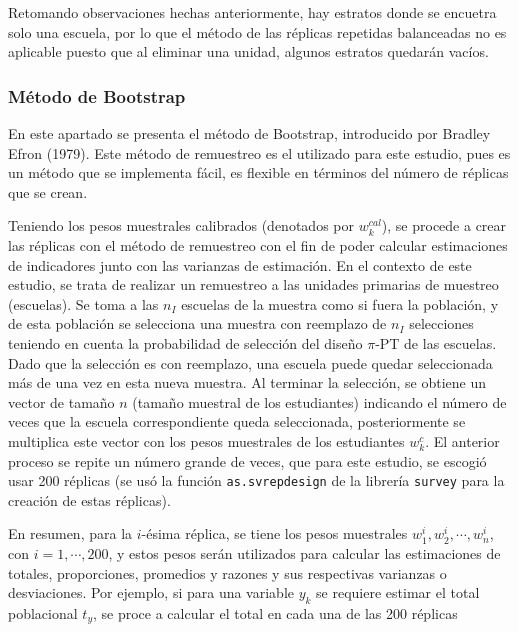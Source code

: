 \documentclass[12pt,spanish,]{book}
\begin{document}
Retomando observaciones hechas anteriormente, hay estratos donde se encuetra solo una escuela, por lo que el método de las réplicas repetidas balanceadas no es aplicable puesto que al eliminar una unidad, algunos estratos quedarán vacíos.

\hypertarget{metodo-de-bootstrap}{%
\subsubsection*{Método de Bootstrap}\label{metodo-de-bootstrap}}

En este apartado se presenta el método de Bootstrap, introducido por Bradley Efron (1979). Este método de remuestreo es el utilizado para este estudio, pues es un método que se implementa fácil, es flexible en términos del número de réplicas que se crean.

Teniendo los pesos muestrales calibrados (denotados por \(w_k^{cal}\)), se procede a crear las réplicas con el método de remuestreo con el fin de poder calcular estimaciones de indicadores junto con las varianzas de estimación. En el contexto de este estudio, se trata de realizar un remuestreo a las unidades primarias de muestreo (escuelas). Se toma a las \(n_I\) escuelas de la muestra como si fuera la población, y de esta población se selecciona una muestra con reemplazo de \(n_I\) selecciones teniendo en cuenta la probabilidad de selección del diseño \(\pi\)-PT de las escuelas. Dado que la selección es con reemplazo, una escuela puede quedar seleccionada más de una vez en esta nueva muestra. Al terminar la selección, se obtiene un vector de tamaño \(n\) (tamaño muestral de los estudiantes) indicando el número de veces que la escuela correspondiente queda seleccionada, posteriormente se multiplica este vector con los pesos muestrales de los estudiantes \(w_k^c\). El anterior proceso se repite un número grande de veces, que para este estudio, se escogió usar 200 réplicas (se usó la función \texttt{as.svrepdesign} de la librería \texttt{survey} para la creación de estas réplicas).

En resumen, para la \(i\)-ésima réplica, se tiene los pesos muestrales \(w_1^i,w_2^i, \cdots, w_n^i\), con \(i=1,\cdots,200\), y estos pesos serán utilizados para calcular las estimaciones de totales, proporciones, promedios y razones y sus respectivas varianzas o desviaciones. Por ejemplo, si para una variable \(y_k\) se requiere estimar el total poblacional \(t_y\), se proce a calcular el total en cada una de las 200 réplicas
\end{document}
